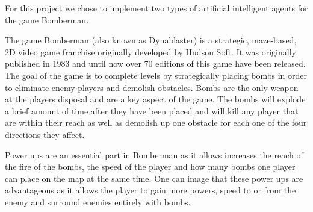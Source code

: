  
For this project we chose to implement two types of artificial intelligent agents for the game Bomberman.

The game Bomberman (also known as Dynablaster) is a strategic, maze-based, 2D video game franchise originally developed by Hudson Soft. It was originally published in 1983 and until now over 70 editions of this game have been released. 
The goal of the game is to complete levels by strategically placing bombs in order to eliminate enemy players and demolish obstacles. 
Bombs are the only weapon at the players disposal and are a key aspect of the game. The bombs will explode a brief amount of time after they have been placed and will kill any player that are within their reach as well as demolish up one obstacle for each one of the four directions they affect. 

Power ups are an essential part in Bomberman as it allows increases the reach of the fire of the bombs, the speed of the player and how many bombs one player can place on the map at the same time. One can image that these power ups are advantageous as it allows the player to gain more powers, speed to or from the enemy and surround enemies entirely with bombs.

